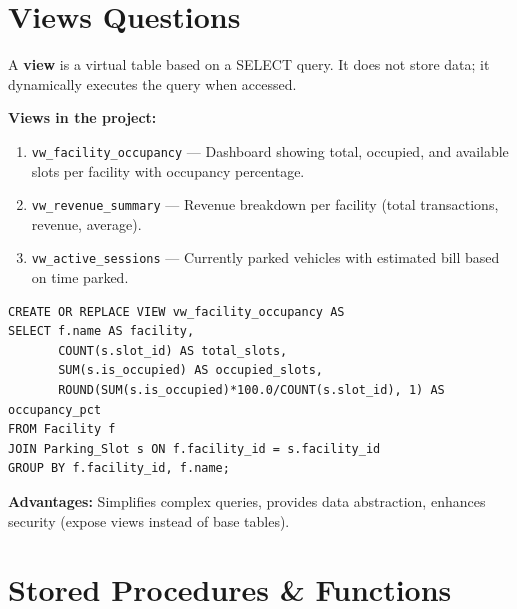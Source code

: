 \documentclass[12pt,a4paper]{article}
\begin{document}
\section{Views Questions}

\begin{questionbox}
\end{questionbox}
\begin{answerbox}
A \textbf{view} is a virtual table based on a SELECT query. It does not store data; it dynamically executes the query when accessed.

\textbf{Views in the project:}
\begin{enumerate}[nosep]
    \item \texttt{vw\_facility\_occupancy} --- Dashboard showing total, occupied, and available slots per facility with occupancy percentage.
    \item \texttt{vw\_revenue\_summary} --- Revenue breakdown per facility (total transactions, revenue, average).
    \item \texttt{vw\_active\_sessions} --- Currently parked vehicles with estimated bill based on time parked.
\end{enumerate}

\begin{lstlisting}
CREATE OR REPLACE VIEW vw_facility_occupancy AS
SELECT f.name AS facility,
       COUNT(s.slot_id) AS total_slots,
       SUM(s.is_occupied) AS occupied_slots,
       ROUND(SUM(s.is_occupied)*100.0/COUNT(s.slot_id), 1) AS occupancy_pct
FROM Facility f
JOIN Parking_Slot s ON f.facility_id = s.facility_id
GROUP BY f.facility_id, f.name;
\end{lstlisting}

\textbf{Advantages:} Simplifies complex queries, provides data abstraction, enhances security (expose views instead of base tables).
\end{answerbox}

\section{Stored Procedures \& Functions}
\end{document}
